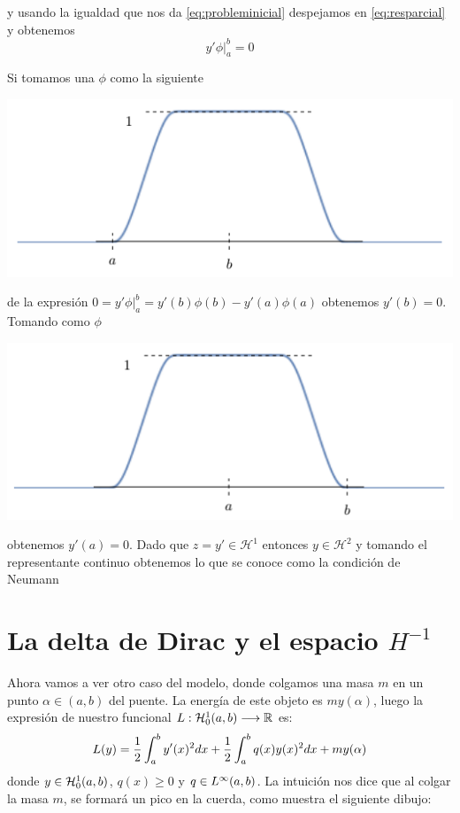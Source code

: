y usando la igualdad que nos da \ref{eq:probleminicial} despejamos en
\ref{eq:resparcial} y obtenemos
\[
y'\phi\Big|^b_a = 0
\]

Si tomamos una $\phi$ como la siguiente

\centerline{\includegraphics[scale=0.5]{img/caso1.png}} 

de la expresión $ 0 = y'\phi\Big|^b_a = y'(b)\phi(b)-y'(a)\phi(a)$
obtenemos $y'(b) = 0$. Tomando como $\phi$

\centerline{\includegraphics[scale=0.5]{img/caso2.png}} 

obtenemos $y'(a) = 0$. Dado que $z=y'\in \mathcal{H}^1$ entonces $y\in \mathcal{H}^2$ y
tomando el representante continuo obtenemos lo que se conoce como la condición de Neumann

\section{La delta de Dirac y el espacio $H^{-1}$}

Ahora vamos a ver otro caso del modelo, donde colgamos una masa $m$ en un punto $\alpha\in(a,b)$ del puente. La energía de este objeto es $my(\alpha)$, luego la expresión de nuestro funcional $L : \mathcal{H}_0^{ 1 } (a,b) \longrightarrow \mathbb{R}$ es:
\[
L(y)=\frac{1}{2}\displaystyle\int_{ a }^{ b } y'(x)^2dx+\frac{1}{2}\displaystyle\int_{ a }^{ b } q(x)y(x)^2dx+my(\alpha)
\]
donde $y\in\mathcal{H}_0^{ 1 } (a,b)$, $q(x)\geq 0$ y  $q\in L^{ \infty }(a,b)$. La intuición nos dice que al colgar la masa $m$, se formará un pico en la cuerda, como muestra el siguiente dibujo:

